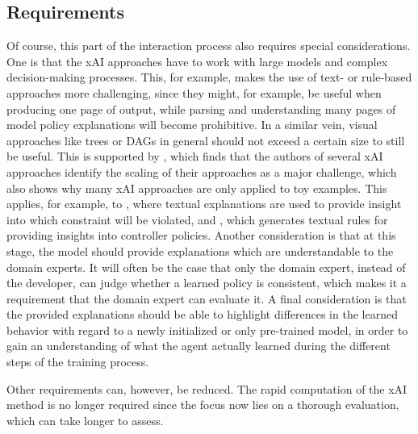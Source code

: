 \documentclass[twoside,11pt]{article}
\begin{document}
\subsection{Requirements}
Of course, this part of the interaction process also requires special considerations. One is that the xAI approaches have to work with large models and complex decision-making processes. This, for example, makes the use of text- or rule-based approaches more challenging, since they might, for example, be useful when producing one page of output, while parsing and understanding many pages of model policy explanations will become prohibitive. In a similar vein, visual approaches like trees or DAGs in general should not exceed a certain size to still be useful. 
This is supported by \citet{WellsBednarz:2021:xAIRLSurvey}, which finds that the authors of several xAI approaches identify the scaling of their approaches as a major challenge, which also shows why many xAI approaches are only applied to toy examples. This applies, for example, to \citet{TabrezHayes:2019:xRLTextualExplanations}, where textual explanations are used to provide insight into which constraint will be violated, and \citet{HayesShah:2017:AutonomousPolicyExplanation}, which generates textual rules for providing insights into controller policies.
Another consideration is that at this stage, the model should provide explanations which are understandable to the domain experts. It will often be the case that only the domain expert, instead of the developer, can judge whether a learned policy is consistent, which makes it a requirement that the domain expert can evaluate it.
A final consideration is that the provided explanations should be able to highlight differences in the learned behavior with regard to a newly initialized or only pre-trained model, in order to gain an understanding of what the agent actually learned during the different steps of the training process.

Other requirements can, however, be reduced. The rapid computation of the xAI method is no longer required since the focus now lies on a thorough evaluation, which can take longer to assess.
\end{document}
